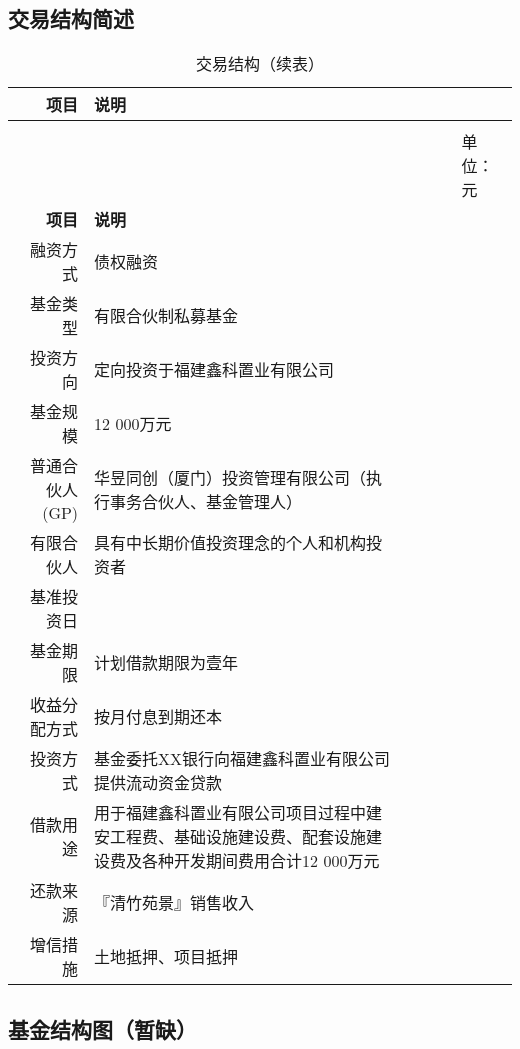 \subsection{交易结构简述}
\renewcommand*{\arraystretch}{1}
\setlength{\tabcolsep}{8pt}
\begin{longtable}{>{\footnotesize}r>{\footnotesize}p{10cm}}
\caption[交易结构]{交易结构}\\  %
\hline\hline
{} \bfseries 项目 	& \bfseries 说明 \\  \endfirsthead          %
\caption[]{交易结构（续表）} \\ 
&&&&& {\scriptsize 单位：元}\\                        %
\hline\hline
{} \bfseries 项目 	& \bfseries 说明 \\ \endhead         %
\hline
\endfoot
\hline   %
融资方式    &   债权融资 \\
基金类型	&	有限合伙制私募基金	\\
投资方向	&	定向投资于福建鑫科置业有限公司	\\
基金规模	&	12 000万元 \\
普通合伙人(GP)	&	华昱同创（厦门）投资管理有限公司（执行事务合伙人、基金管理人）	\\
有限合伙人	&	具有中长期价值投资理念的个人和机构投资者	\\
基准投资日	&		\\
基金期限	 &	计划借款期限为壹年	\\
收益分配方式	&  按月付息到期还本		\\
投资方式	&	基金委托XX银行向福建鑫科置业有限公司提供流动资金贷款	\\
借款用途	&	用于福建鑫科置业有限公司项目过程中建安工程费、基础设施建设费、配套设施建设费及各种开发期间费用合计12 000万元	\\
还款来源	&	『清竹苑景』销售收入	\\
增信措施	&	土地抵押、项目抵押	\\
\bottomrule
\end{longtable}

\subsection{基金结构图（暂缺）}











